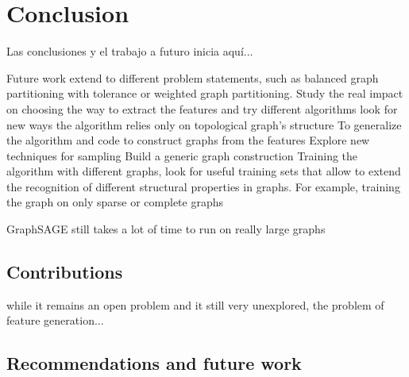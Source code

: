 
\chapter{Conclusion}

Las conclusiones y el trabajo a futuro inicia aqu\'i...

Future work
extend to different problem statements, such as balanced graph partitioning with tolerance or weighted graph partitioning.
Study the real impact on choosing the way to extract the features and try different algorithms
look for new ways the algorithm relies only on topological graph's structure
To generalize the algorithm and code to construct graphs from the features
Explore new techniques for sampling
Build a generic graph construction
Training the algorithm with different graphs, look for useful training sets that allow to extend the recognition of different structural properties in graphs. For example, training the graph on only sparse or complete graphs

GraphSAGE still takes a lot of time to run on really large graphs

\section{Contributions}
while it remains an open problem and it still very unexplored, the problem of feature generation...
\section{Recommendations and future work}

\clearpage